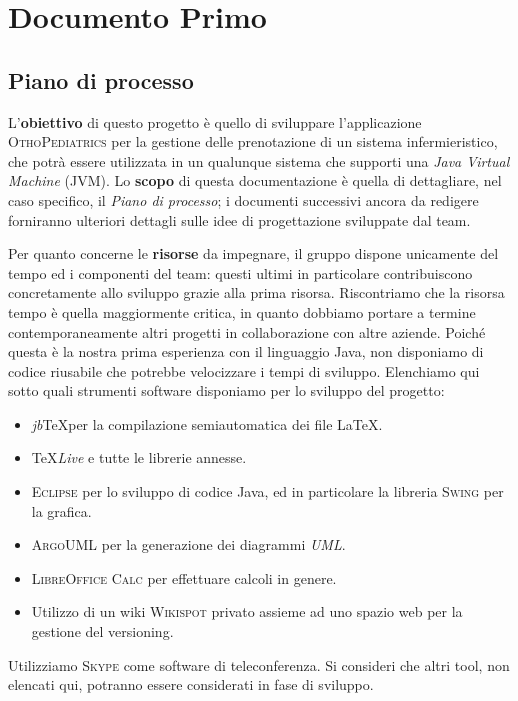 \part{Documento Primo}
\chapter{Piano di processo}
\minitoc\mtcskip

L'\textbf{obiettivo} di questo progetto è quello di sviluppare l'applicazione
\textsc{OthoPediatrics} per la
gestione delle prenotazione di un sistema infermieristico, che
potrà essere utilizzata in un qualunque sistema che supporti una
\textit{Java Virtual Machine} (JVM).
Lo \textbf{scopo} di questa documentazione è quella di dettagliare, nel caso specifico,
il \textit{Piano di processo}; i documenti successivi ancora da redigere forniranno
ulteriori dettagli sulle idee di progettazione sviluppate dal team.

Per quanto concerne le \textbf{risorse} da impegnare, il gruppo dispone unicamente
del tempo  ed i componenti del team: questi ultimi in particolare contribuiscono 
concretamente allo sviluppo grazie alla prima risorsa. 
Riscontriamo che la risorsa tempo è quella maggiormente critica, in quanto
dobbiamo portare a termine contemporaneamente altri progetti in collaborazione
con altre aziende.
Poiché questa è la nostra prima esperienza
con il linguaggio Java, non disponiamo di codice riusabile che potrebbe velocizzare
i tempi di sviluppo. Elenchiamo qui
sotto quali strumenti software disponiamo per lo sviluppo del progetto:
\begin{itemize}
\item \textit{jb}\TeX per la compilazione semiautomatica dei file \LaTeX .
\item \TeX\textit{Live} e tutte le librerie annesse.
\item \textsc{Eclipse} per lo sviluppo di codice Java, ed in particolare la
	libreria \textsc{Swing} per la grafica.
\item \textsc{ArgoUML} per la generazione dei diagrammi \textit{UML}.
\item \textsc{LibreOffice Calc} per effettuare calcoli in genere.
\item Utilizzo di un wiki \textsc{Wikispot} privato assieme ad uno spazio web
      per la gestione del versioning.
\end{itemize}
Utilizziamo \textsc{Skype} come software di teleconferenza. 
Si consideri che altri tool, non elencati qui, potranno essere considerati 
in fase di sviluppo.
